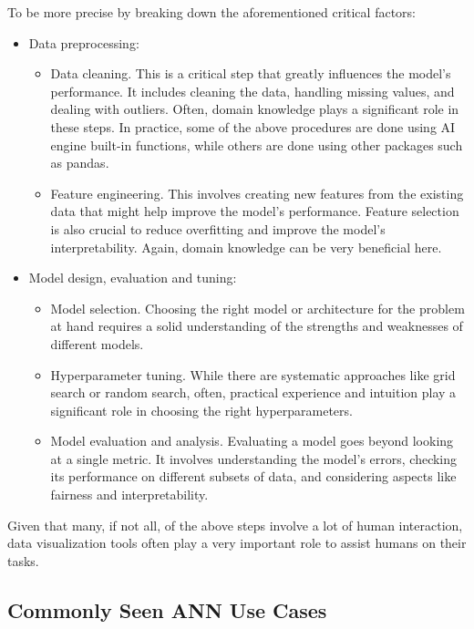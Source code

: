To be more precise by breaking down the aforementioned critical factors:
\begin{itemize}
  \item Data preprocessing:
  \begin{itemize}
      \item Data cleaning. This is a critical step that greatly influences the model's performance. It includes cleaning the data, handling missing values, and dealing with outliers. Often, domain knowledge plays a significant role in these steps. In practice, some of the above procedures are done using AI engine built-in functions, while others are done using other packages such as pandas.
      \item Feature engineering. This involves creating new features from the existing data that might help improve the model's performance. Feature selection is also crucial to reduce overfitting and improve the model's interpretability. Again, domain knowledge can be very beneficial here.
  \end{itemize}
  \item Model design, evaluation and tuning:
  \begin{itemize}
      \item Model selection. Choosing the right model or architecture for the problem at hand requires a solid understanding of the strengths and weaknesses of different models.
      \item Hyperparameter tuning. While there are systematic approaches like grid search or random search, often, practical experience and intuition play a significant role in choosing the right hyperparameters.
      \item Model evaluation and analysis. Evaluating a model goes beyond looking at a single metric. It involves understanding the model's errors, checking its performance on different subsets of data, and considering aspects like fairness and interpretability.
  \end{itemize}
\end{itemize}

Given that many, if not all, of the above steps involve a lot of human interaction, data visualization tools often play a very important role to assist humans on their tasks.

\subsection{Commonly Seen ANN Use Cases}

